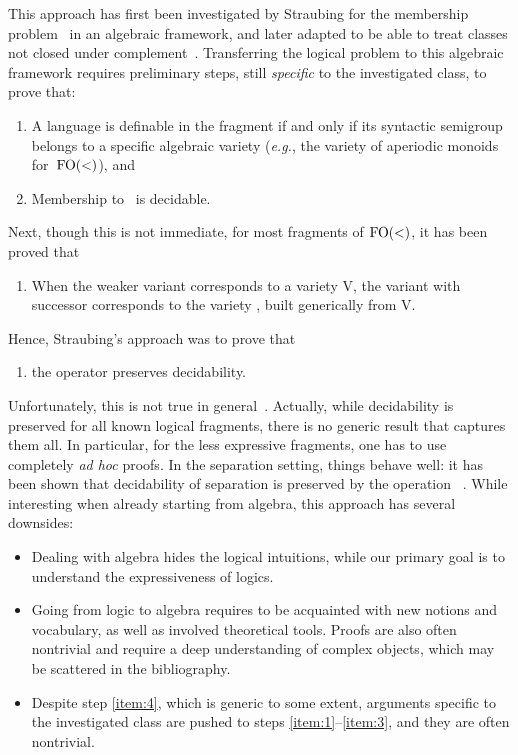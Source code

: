 \documentclass[a4paper,USenglish]{lipics}
\newcommand{\fow}{\ensuremath{\textup{FO}(<)}\xspace}
\theoremstyle{plain}
\begin{document}
This approach has first been investigated by Straubing for the membership
problem~\cite{Str85} in an algebraic framework, and later adapted to be able
to treat classes not closed under complement~\cite{pw:wreath}. Transferring the logical
problem to this algebraic framework requires preliminary steps,
still \emph{specific} to the investigated class, to prove that:
\begin{enumerate}
\item\label{item:1} A language is definable in the fragment if and only if its syntactic semigroup
  belongs to a specific algebraic variety  (\emph{e.g.}, the
  variety of aperiodic monoids for~\fow), and
\item\label{item:2} Membership to~ is decidable.
\end{enumerate}
Next, though this is not immediate, for most fragments of \fow, it has been
proved that \begin{enumerate}[resume]
\item\label{item:3} When the weaker variant corresponds to a variety {\sf V}, the variant
  with successor corresponds to the variety ,
  built generically from {\sf V}.
\end{enumerate}
Hence, Straubing's approach was to prove that
\begin{enumerate}[resume]
\item\label{item:4} the operator 
  preserves decidability.
\end{enumerate}
Unfortunately, this is not true in
general~\cite{DBLP:journals/ijac/Auinger10}. Actually, while
decidability is preserved for all known logical fragments, there is no
generic result that captures them all. In particular, for the less
expressive fragments, one has to use completely \emph{ad hoc} proofs.
In the separation setting, things behave well: it
has been shown that decidability of separation is preserved by the operation ~\cite{Steinberg:delay-pointlikes:2001}.
While interesting when already starting from algebra, this approach has several downsides:
\begin{itemize}
\item Dealing with algebra hides the logical intuitions, while our primary
  goal is to understand the expressiveness of logics.
\item Going from logic to algebra requires to be acquainted with new notions
  and vocabulary, as well as involved theoretical tools. Proofs are also
  often nontrivial and require a deep understanding of complex objects, which
  may be scattered in the bibliography.
\item Despite step \ref{item:4}, which is generic to some extent, arguments
  specific to the investigated class are pushed to steps
  \ref{item:1}--\ref{item:3}, and they are often nontrivial.
\end{itemize}
\end{document}
